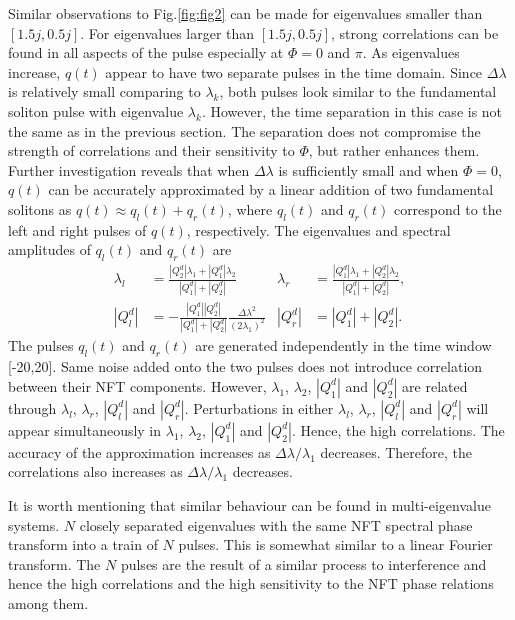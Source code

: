\documentclass[9pt,twocolumn,twoside]{osajnl}
\begin{document}
Similar observations to Fig.\ref{fig:fig2} can be made for eigenvalues smaller than $[1.5j, 0.5j]$. For eigenvalues larger than $[1.5j, 0.5j]$, strong correlations can be found in all aspects of the pulse especially at $\Phi=0$ and $\pi$. As eigenvalues increase, $q(t)$ appear to have two separate pulses in the time domain. Since $\Delta\lambda$ is relatively small comparing to $\lambda_k$, both pulses look similar to the fundamental soliton pulse with eigenvalue $\lambda_k$. However, the time separation in this case is not the same as in the previous section. The separation does not compromise the strength of correlations and their sensitivity to $\Phi$, but rather enhances them. Further investigation reveals that when $\Delta\lambda$ is sufficiently small and when $\Phi=0$, $q(t)$ can be accurately approximated by a linear addition of two fundamental solitons as $q(t)\approx q_l(t)+q_r(t)$, where $q_l(t)$ and $q_r(t)$ correspond to the left and right pulses of $q(t)$, respectively. The eigenvalues and spectral amplitudes of $q_l(t)$ and $q_r(t)$ are 
\begin{subequations}
    \begin{align}
        \lambda_l&=\frac{|Q^d_2|\lambda_1+|Q^d_1|\lambda_2}{|Q^d_1|+|Q^d_2|} & \lambda_r&=\frac{|Q^d_1|\lambda_1+|Q^d_2|\lambda_2}{|Q^d_1|+|Q^d_2|},\\
        |Q^d_l|&=-\frac{|Q^d_1||Q^d_2|}{|Q^d_1|+|Q^d_2|}\frac{\Delta\lambda^2}{(2\lambda_1)^2} & |Q^d_r|&=|Q^d_1|+|Q^d_2|.
    \end{align}
\end{subequations}
The pulses $q_l(t)$ and $q_r(t)$ are generated independently in the time window [-20,20]. Same noise added onto the two pulses does not introduce correlation between their NFT components. However, $\lambda_1$, $\lambda_2$, $|Q^d_1|$ and $|Q^d_2|$ are related through $\lambda_l$, $\lambda_r$, $|Q^d_l|$ and $|Q^d_r|$. Perturbations in either $\lambda_l$, $\lambda_r$, $|Q^d_l|$ and $|Q^d_r|$ will appear simultaneously in $\lambda_1$, $\lambda_2$, $|Q^d_1|$ and $|Q^d_2|$. Hence, the high correlations. The accuracy of the approximation increases as $\Delta\lambda/\lambda_1$ decreases. Therefore, the correlations also increases as $\Delta\lambda/\lambda_1$ decreases.

It is worth mentioning that similar behaviour can be found in multi-eigenvalue systems. $N$ closely separated eigenvalues with the same NFT spectral phase transform into a train of $N$ pulses. This is somewhat similar to a linear Fourier transform. The $N$ pulses are the result of a similar process to interference and hence the high correlations and the high sensitivity to the NFT phase relations among them.
\end{document}
